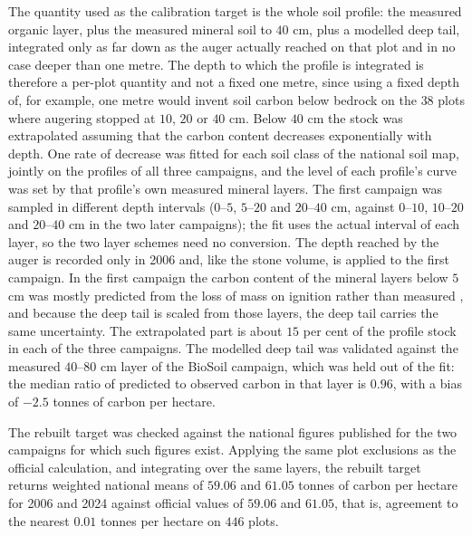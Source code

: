 \documentclass[11pt]{article}
\begin{document}
The quantity used as the calibration target is the whole soil profile: the measured organic
layer, plus the measured mineral soil to $40$ cm, plus a modelled deep tail, integrated only
as far down as the auger actually reached on that plot and in no case deeper than one metre.
The depth to which the profile is integrated is therefore a per-plot quantity and not a fixed
one metre, since using a fixed depth of, for example, one metre would invent soil carbon
below bedrock on the $38$ plots where augering stopped at $10$, $20$ or $40$ cm.
Below $40$ cm the stock was extrapolated assuming that the carbon content decreases
exponentially with depth. One rate of decrease was fitted for each soil class of the national
soil map, jointly on the profiles of all three campaigns, and the level of each profile's curve
was set by that profile's own measured mineral layers. The first campaign was sampled in
different depth intervals ($0$--$5$, $5$--$20$ and $20$--$40$ cm, against $0$--$10$, $10$--$20$
and $20$--$40$ cm in the two later campaigns); the fit uses the actual interval of each layer, so
the two layer schemes need no conversion. The depth reached by the auger is recorded only in
2006 and, like the stone volume, is applied to the first campaign. In the first campaign the
carbon content of the mineral layers below $5$ cm was mostly predicted from the loss of mass on
ignition rather than measured \citep{Kramarenko}, and because the deep tail is scaled from those
layers, the deep tail carries the same uncertainty. The extrapolated part is about $15$ per cent
of the profile stock in each of the three campaigns. The modelled
deep tail was validated against the measured $40$--$80$ cm layer of the BioSoil campaign,
which was held out of the fit: the median ratio of predicted to observed carbon in that layer
is $0.96$, with a bias of $-2.5$ tonnes of carbon per hectare.

The rebuilt target was checked against the national figures published for the two campaigns
for which such figures exist. Applying the same plot exclusions as the official calculation,
and integrating over the same layers, the rebuilt target returns weighted national means of
$59.06$ and $61.05$ tonnes of carbon per hectare for 2006 and 2024 against official values of
$59.06$ and $61.05$, that is, agreement to the nearest $0.01$ tonnes per hectare on $446$
plots.
\end{document}
